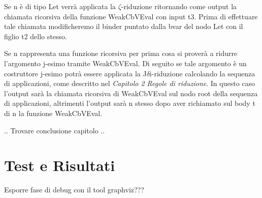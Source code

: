 \documentclass[12pt,a4paper,openright,twoside]{report}
\begin{document}
Se n \`e di tipo Let verr\`a applicata la $\zeta$-riduzione ritornando come output la chiamata ricorsiva della funzione WeakCbVEval con input t3. Prima di effettuare tale chiamata modificheremo il binder puntato dalla bvar del nodo Let con il figlio t2 dello stesso.\newline

Se n rappresenta una funzione ricorsiva per prima cosa si prover\`a a ridurre l'argomento j-esimo tramite WeakCbVEval. Di seguito se tale argomento \`e un costruttore j-esimo potr\`a essere applicata la J$\delta$i-riduzione calcolando la sequenza di applicazioni, come descritto nel \textit{Capitolo 2 Regole di riduzione}. In questo caso l'output sar\`a la chiamata ricorsiva di WeakCbVEval sul nodo root della sequenza di applicazioni, altrimenti l'output sar\`a n stesso dopo aver richiamato sul body t di n la funzione WeakCbVEval.  \newline

\newline.\newline .\newline
Trovare conclusione capitolo
\newline.\newline .\newline
\clearpage{\pagestyle{empty}\cleardoublepage}
\chapter{Test e Risultati}                %
\lhead[\fancyplain{}{\bfseries\thepage}]{\fancyplain{}{\bfseries\rightmark}}
Esporre fase di debug con il tool graphviz???
\end{document}
